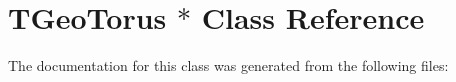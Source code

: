 \hypertarget{class_t_geo_torus_01_5}{}\section{T\+Geo\+Torus $\ast$ Class Reference}
\label{class_t_geo_torus_01_5}


The documentation for this class was generated from the following files\+: